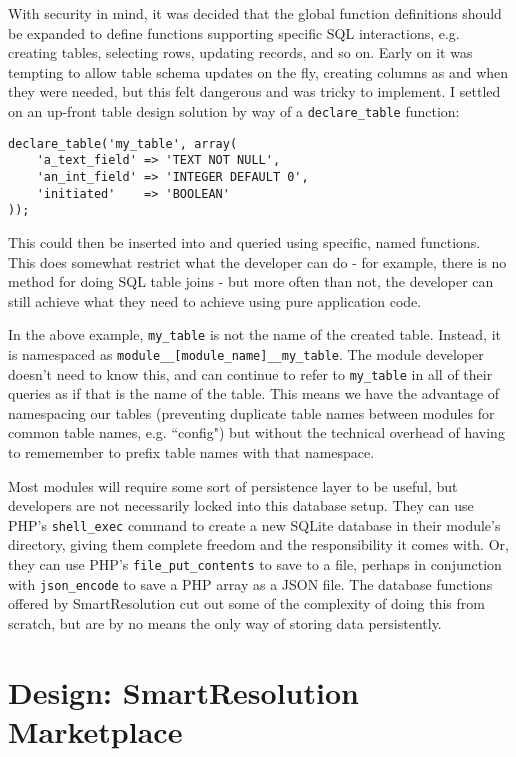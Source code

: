With security in mind, it was decided that the global function definitions should be expanded to define functions supporting specific SQL interactions, e.g. creating tables, selecting rows, updating records, and so on. Early on it was tempting to allow table schema updates on the fly, creating columns as and when they were needed, but this felt dangerous and was tricky to implement. I settled on an up-front table design solution by way of a \lstinline{declare_table} function:

\begin{lstlisting}
declare_table('my_table', array(
    'a_text_field' => 'TEXT NOT NULL',
    'an_int_field' => 'INTEGER DEFAULT 0',
    'initiated'    => 'BOOLEAN'
));
\end{lstlisting}

This could then be inserted into and queried using specific, named functions. This does somewhat restrict what the developer can do - for example, there is no method for doing SQL table joins - but more often than not, the developer can still achieve what they need to achieve using pure application code.

In the above example, \lstinline{my_table} is not the name of the created table. Instead, it is namespaced as \lstinline{module__[module_name]__my_table}. The module developer doesn't need to know this, and can continue to refer to \lstinline{my_table} in all of their queries as if that is the name of the table. This means we have the advantage of namespacing our tables (preventing duplicate table names between modules for common table names, e.g. ``config") but without the technical overhead of having to rememember to prefix table names with that namespace.

Most modules will require some sort of persistence layer to be useful, but developers are not necessarily locked into this database setup. They can use PHP's \lstinline{shell_exec} command to create a new SQLite database in their module's directory, giving them complete freedom and the responsibility it comes with. Or, they can use PHP's \lstinline{file_put_contents} to save to a file, perhaps in conjunction with \lstinline{json_encode} to save a PHP array as a JSON file. The database functions offered by SmartResolution cut out some of the complexity of doing this from scratch, but are by no means the only way of storing data persistently.

\section{Design: SmartResolution Marketplace}

